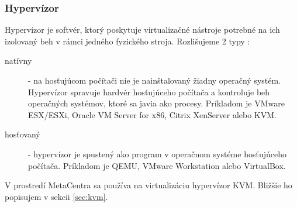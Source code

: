 \documentclass[printed,11pt,twoside,color,cover,table]{fithesis3}
\begin{document}
\subsubsection{Hypervízor}
Hypervízor je softvér, ktorý poskytuje virtualizačné nástroje potrebné na ich izolovaný beh v rámci jedného fyzického stroja. Rozlišujeme 2 typy \cite{hypervisorTypes}:
\begin{description}
\item[natívny] - na hosťujúcom počítači nie je nainštalovaný žiadny operačný systém. Hypervízor spravuje hardvér hosťujúceho počítača a kontroluje beh operačných systémov, ktoré sa javia ako procesy.
Príkladom je VMware ESX/ESXi\footnotemark{}, Oracle VM Server for x86\footnotemark{},
Citrix XenServer\footnotemark{} alebo KVM\footnotemark{}.
\item[hosťovaný] - hypervízor je spustený ako program v operačnom systéme hosťujúceho počítača. Príkladom je QEMU, VMware Workstation alebo VirtualBox.
\end{description}
V prostredí MetaCentra sa používa na virtualizáciu hypervízor KVM. Bližšie ho popisujem v sekcii \ref{sec:kvm}.
\end{document}
